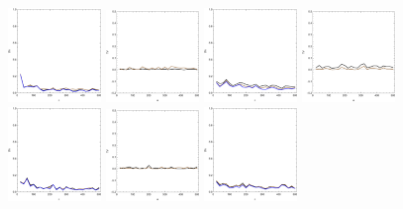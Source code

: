 \documentclass[
twoside,
openright,
titlepage,
numbers=noenddot,
headinclude,%
footinclude=true,
dottedtoc, %
ngerman,
american, %
pagesize=pdftex,
]{book}
\begin{document}
	\begin{example}
		\begin{figure}[H]
			\centering
			\captionsetup{width=0.95\textwidth}
			\includegraphics[width=0.22\textwidth]{figures/1DTVexamples/n1}
			\includegraphics[width=0.22\textwidth]{figures/1DTVexamples/n2}
			\includegraphics[width=0.22\textwidth]{figures/1DTVexamples/t1}
			\includegraphics[width=0.22\textwidth]{figures/1DTVexamples/t2}
			\includegraphics[width=0.22\textwidth]{figures/1DTVexamples/l1}
			\includegraphics[width=0.22\textwidth]{figures/1DTVexamples/l2}
			\includegraphics[width=0.22\textwidth]{figures/1DTVexamples/sn1}

\end{figure}
\end{example}
\end{document}
